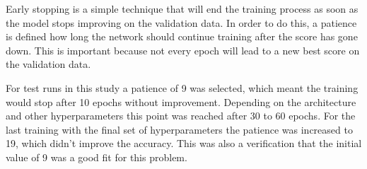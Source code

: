 Early stopping is a simple technique that will end the training process as soon as the model stops improving on the validation data. In order to do this, a patience is defined how long the network should continue training after the score has gone down. This is important because not every epoch will lead to a new best score on the validation data.

For test runs in this study a patience of 9 was selected, which meant the training would stop after 10 epochs without improvement. Depending on the architecture and other hyperparameters this point was reached after 30 to 60 epochs. For the last training with the final set of hyperparameters the patience was increased to 19, which didn't improve the accuracy.  This was also a verification that the initial value of 9 was a good fit for this problem.



\newpage
